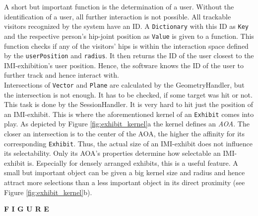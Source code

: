 A short but important function is the determination of a user. Without the identification of a user, all further interaction is not possible. All trackable visitors recognized by the system have an \ac{ID}. A \texttt{Dictionary} with this \ac{ID} as \texttt{Key} and the respective person's hip-joint position as \texttt{Value} is given to a function. This function checks if any of the visitors' hips is within the interaction space defined by the \texttt{userPosition} and \texttt{radius}. It then returns the \ac{ID} of the user closest to the \ac{IMI}-exhibition's user position. Hence, the software knows the \ac{ID} of the user to further track and hence interact with.
\\
Intersections of \texttt{Vector} and \texttt{Plane} are calculated by the GeometryHandler, but the intersection is not enough. It has to be checked, if some target was hit or not. This task is done by the SessionHandler. It is very hard to hit just the position of an \ac{IMI}-exhibit. This is where the aforementioned kernel of an \texttt{Exhibit} comes into play. As depicted by Figure \ref{fig:exhibit_kernel}a the kernel defines an \textit{\ac{AOA}}. The closer an intersection is to the center of the \ac{AOA}, the higher the affinity for its corresponding \texttt{Exhibit}. Thus, the actual size of an \ac{IMI}-exhibit does not influence its selectability. Only its \ac{AOA}'s properties determine how selectable an \ac{IMI}-exhibit is. Especially for densely arranged exhibits, this is a useful feature. A small but important object can be given a big kernel size and radius and hence attract more selections than a less important object in its direct proximity (see Figure \ref{fig:exhibit_kernel}b).

\textbf{F I G U R E}

